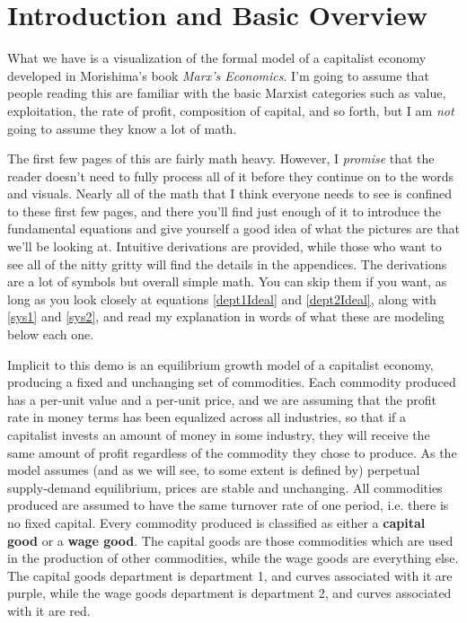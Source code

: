 \documentclass{article}
\theoremstyle{theorem}
\begin{document}
\section{Introduction and Basic Overview}
What we have is a visualization of the formal model of a capitalist economy developed in Morishima's book \emph{Marx's Economics}. I'm going to assume that people reading this are familiar with the basic Marxist categories such as value, exploitation, the rate of profit, composition of capital, and so forth, but I am \emph{not} going to assume they know a lot of math. \par 
The first few pages of this are fairly math heavy. However, I \emph{promise} that the reader doesn't need to fully process all of it before they continue on to the words and visuals. Nearly all of the math that I think everyone needs to see is confined to these first few pages, and there you'll find just enough of it to introduce the fundamental equations and give yourself a good idea of what the pictures are that we'll be looking at. Intuitive derivations are provided, while those who want to see all of the nitty gritty will find the details in the appendices. The derivations are a lot of symbols but overall simple math. You can skip them if you want, as long as you look closely at equations \ref{dept1Ideal} and \ref{dept2Ideal}, along with \ref{sys1} and \ref{sys2}, and read my explanation in words of what these are modeling below each one. \par 
Implicit to this demo is an equilibrium growth model of a capitalist economy, producing a fixed and unchanging set of commodities. Each commodity produced has a per-unit value and a per-unit price, and we are assuming that the profit rate in money terms has been equalized across all industries, so that if a capitalist invests an amount of money in some industry, they will receive the same amount of profit regardless of the commodity they chose to produce. As the model assumes (and as we will see, to some extent is defined by) perpetual supply-demand equilibrium, prices are stable and unchanging. All commodities produced are assumed to have the same turnover rate of one period, i.e. there is no fixed capital. Every commodity produced is classified as either a \textbf{capital good} or a \textbf{wage good}. The capital goods are those commodities which are used in the production of other commodities, while the wage goods are everything else. The capital goods department is department 1, and curves associated with it are purple, while the wage goods department is department 2, and curves associated with it are red. \par 
\end{document}
